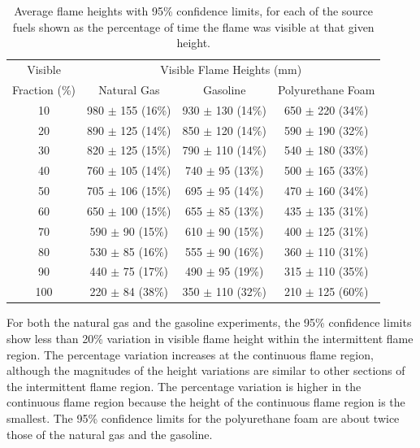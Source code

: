 \documentclass[twoside]{uocthesis}
\begin{document}
{\begin{table}
\centering
\begin{tabular}{|c|c|c|c|}
\hline
Visible         &   \multicolumn{3}{|c|}{Visible Flame Heights (mm)} \\ \cline{2-4}
Fraction (\%)   &       Natural Gas	            &   Gasoline	            & Polyurethane Foam \\ \hline \hline
10              &       980 $\pm$ 155 (16\%)   &	930 $\pm$ 130 (14\%) 	& 650 $\pm$ 220 (34\%)   \\
20              &   	890 $\pm$ 125 (14\%)   &	850 $\pm$ 120 (14\%) 	& 590 $\pm$ 190 (32\%)   \\
30              &   	820 $\pm$ 125 (15\%)   &	790 $\pm$ 110 (14\%) 	& 540 $\pm$ 180 (33\%)   \\
40              &   	760 $\pm$ 105 (14\%)   &	740 $\pm$ 95 (13\%) 	& 500 $\pm$ 165 (33\%)   \\
50              &   	705 $\pm$ 106 (15\%)   &	695 $\pm$ 95 (14\%) 	& 470 $\pm$ 160 (34\%)   \\
60              &   	650 $\pm$ 100 (15\%)   &	655 $\pm$ 85 (13\%) 	& 435 $\pm$ 135 (31\%)   \\
70              &   	590 $\pm$ 90 (15\%)    &	610 $\pm$ 90 (15\%) 	& 400 $\pm$ 125 (31\%)   \\
80              &   	530 $\pm$ 85 (16\%)    &	555 $\pm$ 90 (16\%) 	& 360 $\pm$ 110 (31\%)   \\
90              &   	440 $\pm$ 75 (17\%)    &	490 $\pm$ 95 (19\%) 	& 315 $\pm$ 110 (35\%)   \\
100	            &       220 $\pm$ 84 (38\%)    &	350 $\pm$ 110 (32\%) 	& 210 $\pm$ 125 (60\%)   \\
\hline
\end{tabular}
 \caption[Average flame heights for three fuels]{Average flame heights with 95\% confidence limits, for each of the source fuels shown as the percentage of time the flame was visible at that given height.}
 \label{tab:Average_Flame_Heights}
\end{table}


For both the natural gas and the gasoline experiments, the 95\% confidence limits show less than 20\% variation in visible flame height within the intermittent flame region.  The percentage variation increases at the continuous flame region, although the magnitudes of the height variations are similar to other sections of the intermittent flame region.  The percentage variation is higher in the continuous flame region because the height of the continuous flame region is the smallest.  The 95\% confidence limits for the polyurethane foam are about twice those of the natural gas and the gasoline.

}
\end{document}
